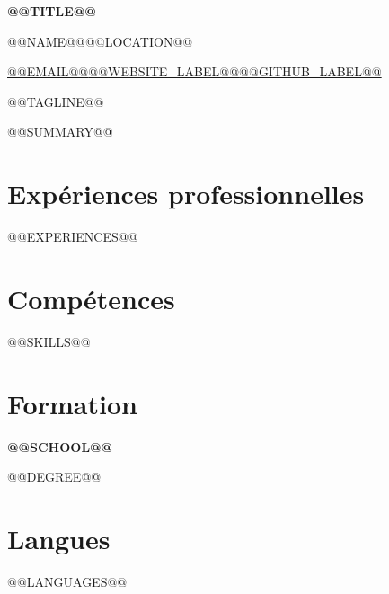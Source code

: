 \documentclass[a4paper,10pt]{article}
\begin{document}
{\fontsize{27}{30}\selectfont\bfseries @@TITLE@@}\par
\vspace{6pt}
{\large\color{accent}@@NAME@@}\hfill{\color{muted}@@LOCATION@@}\par
\vspace{7pt}
\href{mailto:@@EMAIL@@}{@@EMAIL@@}\quad\textbar\quad\href{@@WEBSITE@@}{@@WEBSITE_LABEL@@}\quad\textbar\quad\href{@@GITHUB@@}{@@GITHUB_LABEL@@}\par
\vspace{8pt}
{\color{muted}@@TAGLINE@@}\par
\vspace{8pt}
@@SUMMARY@@\par

\section{Expériences professionnelles}
@@EXPERIENCES@@

\section{Compétences}
@@SKILLS@@

\section{Formation}
\textbf{@@SCHOOL@@}\hfill@@YEAR@@\par
@@DEGREE@@\par

\section{Langues}
@@LANGUAGES@@\par
\end{document}
